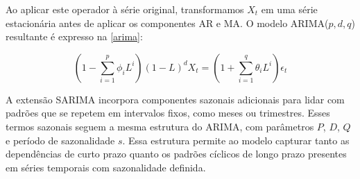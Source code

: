 Ao aplicar este operador à série original, transformamos $X_t$ em uma série estacionária antes de aplicar os componentes
AR e MA. O modelo ARIMA($p, d, q$) resultante é expresso na \autoref{arima}:

\begin{equation}
    \label{arima}
    \left(1 - \sum_{i=1}^p \phi_i L^i\right) (1 - L)^d X_t = \left(1 + \sum_{i=1}^q \theta_i L^i\right) \epsilon_t
\end{equation}

A extensão SARIMA incorpora componentes sazonais adicionais para lidar com padrões que se repetem em intervalos fixos,
como meses ou trimestres. Esses termos sazonais seguem a mesma estrutura do ARIMA, com parâmetros $P$, $D$, $Q$ e
período de sazonalidade $s$. Essa estrutura permite ao modelo capturar tanto as dependências de curto prazo quanto os
padrões cíclicos de longo prazo presentes em séries temporais com sazonalidade definida.



